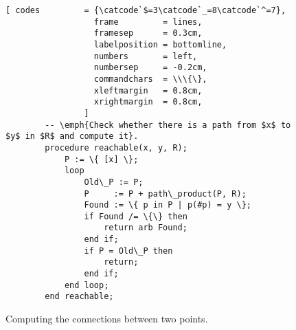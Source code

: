 \begin{figure}[!ht]
  \centering
\begin{Verbatim}[ codes         = {\catcode`$=3\catcode`_=8\catcode`^=7},
                  frame         = lines, 
                  framesep      = 0.3cm, 
                  labelposition = bottomline,
                  numbers       = left,
                  numbersep     = -0.2cm,
                  commandchars  = \\\{\},
                  xleftmargin   = 0.8cm,
                  xrightmargin  = 0.8cm,
                ]
        -- \emph{Check whether there is a path from $x$ to $y$ in $R$ and compute it}.
        procedure reachable(x, y, R);
            P := \{ [x] \};
            loop
                Old\_P := P;
                P     := P + path\_product(P, R);
                Found := \{ p in P | p(#p) = y \};
                if Found /= \{\} then
                    return arb Found;
                end if;
                if P = Old\_P then
                    return;
                end if;
            end loop;
        end reachable;
\end{Verbatim} 
\vspace*{-0.3cm}
\caption{Computing the connections between two points.}  
\label{fig:find-path.stl}
\end{figure} %




